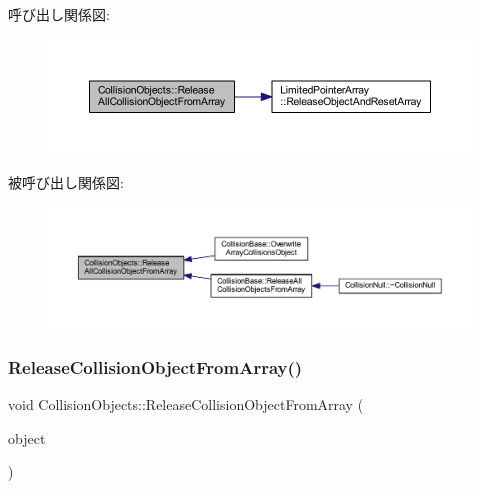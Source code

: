 呼び出し関係図\+:\nopagebreak
\begin{figure}[H]
\begin{center}
\leavevmode
\includegraphics[width=350pt]{class_collision_objects_a2efe32f283fe9b2a30ff8d1e370f152d_cgraph}
\end{center}
\end{figure}
被呼び出し関係図\+:\nopagebreak
\begin{figure}[H]
\begin{center}
\leavevmode
\includegraphics[width=350pt]{class_collision_objects_a2efe32f283fe9b2a30ff8d1e370f152d_icgraph}
\end{center}
\end{figure}
\mbox{\label{class_collision_objects_a38bfe55a93549c90d416c0d1d560932b}} 
\subsubsection{\texorpdfstring{Release\+Collision\+Object\+From\+Array()}{ReleaseCollisionObjectFromArray()}}
{\footnotesize\ttfamily void Collision\+Objects\+::\+Release\+Collision\+Object\+From\+Array (\begin{DoxyParamCaption}\item[{\mbox{\hyperlink{class_collision_object}{Collision\+Object}} $\ast$}]{object }\end{DoxyParamCaption})\hspace{0.3cm}{\ttfamily [inline]}}



